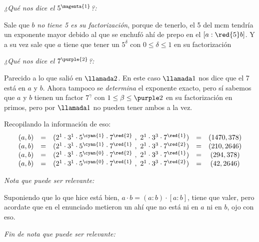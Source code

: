 \bigskip

\textit{¿Qué nos dice el $5^{\magenta{1}}$?:}\par
Sale que $b$ \textit{no tiene 5 es su factorización}, porque de tenerlo, el 5 del mcm tendría un exponente mayor debido al  que se enchufó
ahí de prepo en el $[a:\red{5}b]$. Y a su vez sale que $a$ tiene que tener un $5^\delta$ con $0 \leq \delta \leq 1$ en su factorización

\bigskip

\textit{¿Qué nos dice el $7^{\purple{2}}$?:}\par
Parecido a lo que salió en $\llamada2$. En este caso
$\llamada1$ nos dice que el 7 está en $a$ y $b$. Ahora tampoco se \textit{determina} el exponente exacto, pero sí sabemos
que $a$ y $b$ tienen un factor $7^{\gamma}$ con $1 \leq \beta \leq \purple2$ en su factorización en primos, pero por $\llamada1$ no
pueden tener ambos  a la vez.

\bigskip

Recopilando la información de eso:
$$
  \begin{array}{rcccc}
    (a,b) & = & (2^1 \cdot 3^1 \cdot 5^{\cyan{1}} \cdot 7^{\red{2}}\ ,\  2^1 \cdot 3^3 \cdot 7^{\red{1}} ) & = & (1470,378) \\
    (a,b) & = & (2^1 \cdot 3^1 \cdot 5^{\cyan{1}} \cdot 7^{\red{1}}\ ,\  2^1 \cdot 3^3 \cdot 7^{\red{2}} ) & = & (210,2646) \\
    (a,b) & = & (2^1 \cdot 3^1 \cdot 5^{\cyan{0}} \cdot 7^{\red{2}}\ ,\  2^1 \cdot 3^3 \cdot 7^{\red{1}} ) & = & (294,378)  \\
    (a,b) & = & (2^1 \cdot 3^1 \cdot 5^{\cyan{0}} \cdot 7^{\red{1}}\ ,\  2^1 \cdot 3^3 \cdot 7^{\red{2}} ) & = & (42,2646)
  \end{array}
$$

\textit{Nota que puede ser relevante:}\par
Suponiendo que lo que hice está bien, $a \cdot b = (a:b) \cdot [a:b]$, tiene que valer, pero acordate que
en el enunciado metieron un  ahí que no está ni en $a$ ni en $b$, ojo con eso.\par
\textit{Fin de nota que puede ser relevante:}\par

\begin{aportes}
  \item {}
\end{aportes}
